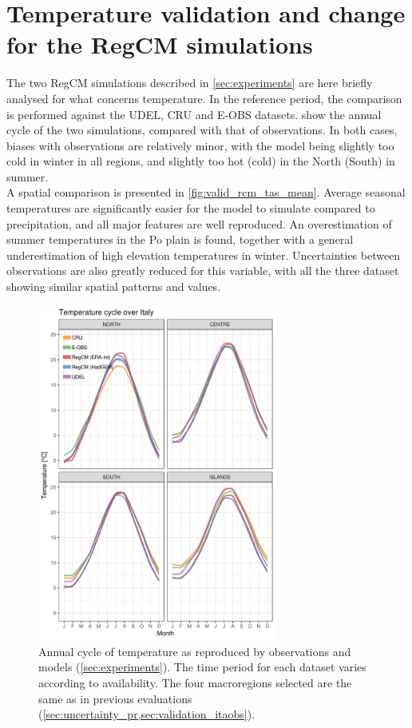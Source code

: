 \chapter{Temperature validation and change for the RegCM simulations}  \label{appendix_tas}
The two RegCM simulations described in \cref{sec:experiments} are here briefly analysed for what concerns temperature.
In the reference period, the comparison is performed against the UDEL\citep{Willmott2001}, CRU\citep{Harris2014} and E-OBS \citep{Haylock2008} datasets.
 show the annual cycle of the two simulations, compared with that of observations.
In both cases, biases with observations are relatively minor, with the model being slightly too cold in winter in all regions, and slightly too hot (cold) in the North (South) in summer.\\
A spatial comparison is presented in \cref{fig:valid_rcm_tas_mean}. Average seasonal temperatures are significantly easier for the model to simulate compared to precipitation, and all major features are well reproduced.
An overestimation of summer temperatures in the Po plain is found, together with a general underestimation of high elevation temperatures in winter.
Uncertainties between observations are also greatly reduced for this variable, with all the three dataset showing similar spatial patterns and values.
\begin{figure}
    \centering
    \includegraphics[width=0.7\textwidth]{figures/valid_rcm/tas/ac}
    \decoRule
    \caption[Validation of temperature annual cycle]{
        Annual cycle of temperature as reproduced by observations and models (\cref{sec:experiments}). The time period for each dataset varies according to availability. The four macroregions selected are the same as in previous evaluations (\cref{sec:uncertainty_pr,sec:validation_itaobs}).
    }\label{fig:valid_rcm_tas_ac}
\end{figure}
